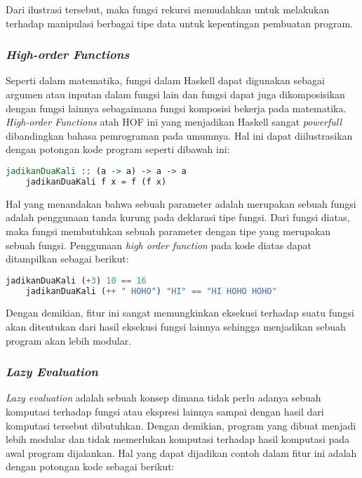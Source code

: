 \documentclass[pi.tex]{subfile}
\begin{document}
  Dari ilustrasi tersebut, maka fungsi rekursi memudahkan untuk melakukan terhadap manipulasi berbagai tipe data untuk kepentingan pembuatan program.

  \subsubsection{\emph{High-order Functions}}
  
  Seperti dalam matematika, fungsi dalam Haskell dapat digunakan sebagai argumen atau inputan dalam fungsi lain dan fungsi dapat juga dikomposisikan dengan fungsi lainnya sebagaimana fungsi komposisi bekerja pada matematika.  \emph{High-order Functions} atah HOF ini yang menjadikan Haskell sangat \emph{powerfull} dibandingkan bahasa pemrograman pada umumnya. Hal ini dapat diilustrasikan dengan potongan kode program seperti dibawah ini:\\
  \begin{lstlisting}[language=Haskell]
    jadikanDuaKali :: (a -> a) -> a -> a  
    jadikanDuaKali f x = f (f x) 
  \end{lstlisting}

  Hal yang menandakan bahwa sebuah parameter adalah merupakan sebuah fungsi adalah penggunaan tanda kurung \fhaskell{()} pada deklarasi tipe fungsi. Dari fungsi diatas, maka fungsi  membutuhkan sebuah parameter dengan tipe  yang merupakan sebuah fungsi. Penggunaan \emph{high order function} pada kode diatas dapat ditampilkan sebagai berikut:\\

  \begin{lstlisting}[language=Haskell]
    jadikanDuaKali (+3) 10 == 16
    jadikanDuaKali (++ " HOHO") "HI" == "HI HOHO HOHO"
  \end{lstlisting}

Dengan demikian, fitur ini sangat memungkinkan eksekusi terhadap suatu fungsi akan ditentukan dari hasil eksekusi fungsi lainnya sehingga menjadikan sebuah program akan lebih modular.

\subsubsection{\emph{Lazy Evaluation}}
  
\emph{Lazy evaluation} adalah sebuah konsep dimana tidak perlu adanya sebuah komputasi terhadap fungsi atau ekspresi lainnya sampai dengan hasil dari komputasi tersebut dibutuhkan. Dengan demikian, program yang dibuat menjadi lebih modular dan tidak memerlukan komputasi terhadap hasil komputasi pada awal program dijalankan. Hal yang dapat dijadikan contoh dalam fitur ini adalah dengan potongan kode sebagai berikut:\\
\end{document}
